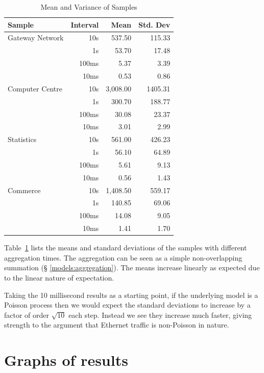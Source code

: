 \begin{table}[t]
\begin{center}
{\begin{tabular}{|p{4cm}|r|r|r|} \hline
Sample & Interval & Mean & Std. Dev \\ \hline \hline
Gateway Network & 10s	& 537.50 &  115.33 \\
		& 1s    &  53.70 &   17.48 \\
		& 100ms &   5.37 &    3.39 \\
		& 10ms  &   0.53 &    0.86 \\ \hline
Computer Centre & 10s & 3,008.00 & 1405.31 \\
		& 1s  &   300.70 &  188.77 \\
		& 100ms &  30.08 &   23.37 \\
		& 10ms  &   3.01 &    2.99 \\ \hline
Statistics	& 10s &   561.00 &  426.23 \\
		& 1s  &    56.10 &   64.89 \\
		& 100ms &   5.61 &    9.13 \\
		& 10ms  &   0.56 &    1.43 \\ \hline
Commerce	& 10s & 1,408.50 &  559.17 \\
		& 1s  &   140.85 &   69.06 \\
		& 100ms &  14.08 &    9.05 \\
		& 10ms  &   1.41 &    1.70 \\ \hline 
\end{tabular}}
\end{center}
\caption{Mean and Variance of Samples}
\label{results:means}
\end{table}

Table~\ref{results:means} lists the means and standard deviations of
the samples with different aggregation times.  The aggregation can be
seen as a simple non-overlapping summation (\S
\ref{models:aggregation}).  The means increase linearly as expected due
to the linear nature of expectation.

Taking the 10 millisecond results as a starting point, if the
underlying model is a Poisson process then we would expect the
standard deviations to increase by a factor of order $\sqrt{10}$ each
step.  Instead we see they increase much faster, giving strength to
the argument that Ethernet traffic is non-Poisson in nature.

\section{Graphs of results}


